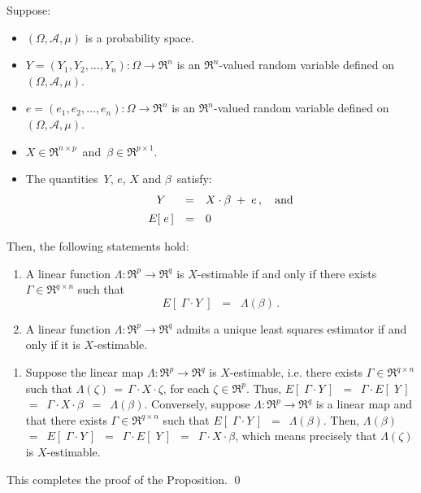 \begin{proposition}
\mbox{}\vskip 0.1cm\noindent
Suppose:
\begin{itemize}
\item
	$(\Omega,\mathcal{A},\mu)$ is a probability space.
\item
	$Y = (Y_{1}, Y_{2}, \ldots, Y_{n}) : \Omega \longrightarrow \Re^{n}$ is an $\Re^{n}$-valued random variable
	defined on $(\Omega,\mathcal{A},\mu)$.
\item
	$e = (e_{1}, e_{2}, \ldots, e_{n}) : \Omega \longrightarrow \Re^{n}$ is an $\Re^{n}$-valued random variable
	defined on $(\Omega,\mathcal{A},\mu)$.
\item
	$X \in \Re^{n \times p}$\, and \,$\beta \in \Re^{p \times 1}$.
\item
	The quantities \,$Y$, $e$, $X$ and $\beta$\, satisfy:
	\begin{equation*}
	\begin{array}{ccl}
	Y & = & X \cdot \beta \; + \; e\,, \quad\textnormal{and}
	\\
	E\!\left[\;e\,\right] & \overset{{\color{white}\vert}}{=} & 0
	\end{array}
	\end{equation*}
\end{itemize}
Then, the following statements hold:
\begin{enumerate}
\item
	A linear function $\Lambda : \Re^{p} \longrightarrow \Re^{q}$ is $X$-estimable
	if and only if there exists $\Gamma \in \Re^{q \times n}$ such that
	\begin{equation*}
	E\!\left[\;\Gamma \cdot Y\;\right] \;\; = \;\; \Lambda(\beta)\,.
	\end{equation*}
\item
	A linear function $\Lambda : \Re^{p} \longrightarrow \Re^{q}$ admits a unique
	least squares estimator if and only if it is $X$-estimable.	
\end{enumerate}
\end{proposition}
\proof
\begin{enumerate}
\item
	Suppose the linear map $\Lambda : \Re^{p} \longrightarrow \Re^{q}$
	is $X$-estimable, i.e. there exists $\Gamma \in \Re^{q \times n}$ such that
	$\Lambda(\zeta) \,=\, \Gamma \cdot X \cdot \zeta$, for each $\zeta \in \Re^{p}$.
	Thus,
	$E\!\left[\;\Gamma \cdot Y\,\right]$
	\,$=$\, $\Gamma \cdot E\!\left[\;Y\,\right]$
	\,$=$\, $\Gamma \cdot X \cdot \beta$
	\,$=$\, $\Lambda(\beta)$.
	Conversely, suppose $\Lambda : \Re^{p} \longrightarrow \Re^{q}$ is a linear map
	and that there exists $\Gamma \in \Re^{q \times n}$ such that $E\!\left[\;\Gamma \cdot Y\,\right]$
	\,$=$\, $\Lambda(\beta)$. Then,
	$\Lambda(\beta)$
	\,$=$\, $E\!\left[\;\Gamma \cdot Y\,\right]$
	\,$=$\, $\Gamma \cdot E\!\left[\;Y\,\right]$
	\,$=$\, $\Gamma \cdot X \cdot \beta$,
	which means precisely that $\Lambda(\zeta)$ is $X$-estimable.
\end{enumerate}
This completes the proof of the Proposition.
\qed


